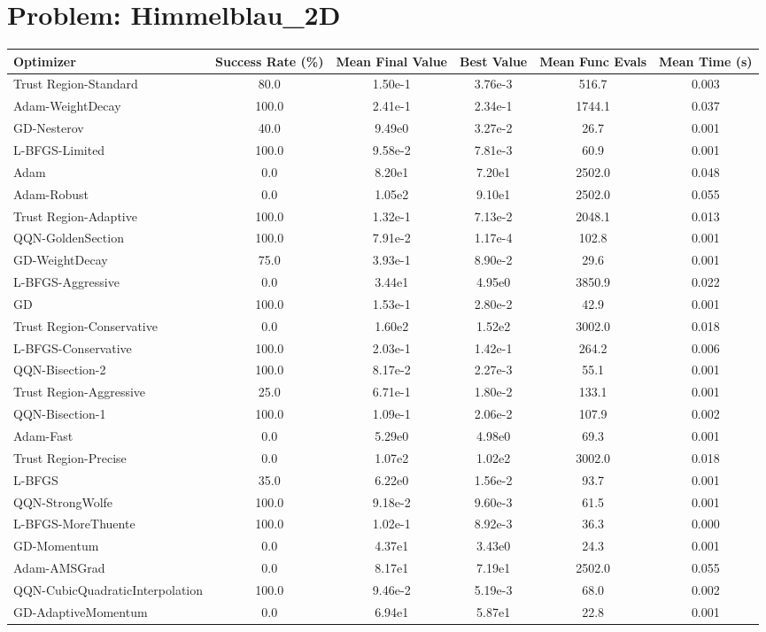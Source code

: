 \documentclass{article}
\begin{document}
\section{Problem: Himmelblau\_2D}
\begin{longtable}{p{3cm}*{5}{c}}
\toprule
\textbf{Optimizer} & \textbf{Success Rate (\%)} & \textbf{Mean Final Value} & \textbf{Best Value} & \textbf{Mean Func Evals} & \textbf{Mean Time (s)} \\
\midrule
Trust Region-Standard & 80.0 & 1.50e-1 & 3.76e-3 & 516.7 & 0.003 \\
Adam-WeightDecay & 100.0 & 2.41e-1 & 2.34e-1 & 1744.1 & 0.037 \\
GD-Nesterov & 40.0 & 9.49e0 & 3.27e-2 & 26.7 & 0.001 \\
L-BFGS-Limited & 100.0 & 9.58e-2 & 7.81e-3 & 60.9 & 0.001 \\
Adam & 0.0 & 8.20e1 & 7.20e1 & 2502.0 & 0.048 \\
Adam-Robust & 0.0 & 1.05e2 & 9.10e1 & 2502.0 & 0.055 \\
Trust Region-Adaptive & 100.0 & 1.32e-1 & 7.13e-2 & 2048.1 & 0.013 \\
QQN-GoldenSection & 100.0 & 7.91e-2 & 1.17e-4 & 102.8 & 0.001 \\
GD-WeightDecay & 75.0 & 3.93e-1 & 8.90e-2 & 29.6 & 0.001 \\
L-BFGS-Aggressive & 0.0 & 3.44e1 & 4.95e0 & 3850.9 & 0.022 \\
GD & 100.0 & 1.53e-1 & 2.80e-2 & 42.9 & 0.001 \\
Trust Region-Conservative & 0.0 & 1.60e2 & 1.52e2 & 3002.0 & 0.018 \\
L-BFGS-Conservative & 100.0 & 2.03e-1 & 1.42e-1 & 264.2 & 0.006 \\
QQN-Bisection-2 & 100.0 & 8.17e-2 & 2.27e-3 & 55.1 & 0.001 \\
Trust Region-Aggressive & 25.0 & 6.71e-1 & 1.80e-2 & 133.1 & 0.001 \\
QQN-Bisection-1 & 100.0 & 1.09e-1 & 2.06e-2 & 107.9 & 0.002 \\
Adam-Fast & 0.0 & 5.29e0 & 4.98e0 & 69.3 & 0.001 \\
Trust Region-Precise & 0.0 & 1.07e2 & 1.02e2 & 3002.0 & 0.018 \\
L-BFGS & 35.0 & 6.22e0 & 1.56e-2 & 93.7 & 0.001 \\
QQN-StrongWolfe & 100.0 & 9.18e-2 & 9.60e-3 & 61.5 & 0.001 \\
L-BFGS-MoreThuente & 100.0 & 1.02e-1 & 8.92e-3 & 36.3 & 0.000 \\
GD-Momentum & 0.0 & 4.37e1 & 3.43e0 & 24.3 & 0.001 \\
Adam-AMSGrad & 0.0 & 8.17e1 & 7.19e1 & 2502.0 & 0.055 \\
QQN-CubicQuadraticInterpolation & 100.0 & 9.46e-2 & 5.19e-3 & 68.0 & 0.002 \\
GD-AdaptiveMomentum & 0.0 & 6.94e1 & 5.87e1 & 22.8 & 0.001 \\
\bottomrule
\end{longtable}
\end{document}
